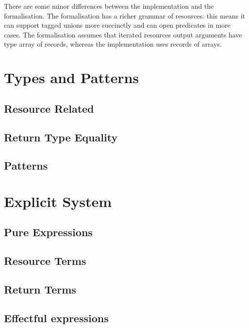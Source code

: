 \documentclass[11pt]{article}%
\begin{document}
There are some minor differences between the implementation and the
formalisation. The formalisation has a richer grammar of resources:
this means it can support tagged unions more succinctly and can open
predicates in more cases. The formalisation assumes that iterated
resources output arguments have type array of records, whereas the
implementation uses records of arrays.


\raggedright%

\section{Types and Patterns}

\subsection{Resource Related}
\cndefnsresXXjudge%

\subsection{Return Type Equality}
\cndefnsretXXjudge%

\subsection{Patterns}
\cndefnspatXXjudge%

\section{Explicit System}

\subsection{Pure Expressions}
\cndefnsexplXXpure%

\subsection{Resource Terms}
\cndefnsexplXXres%

\subsection{Return Terms}
\cndefnsexplXXspine%

\subsection{Effectful expressions}
\cndefnsexplXXaction%
\cndefnsexplXXmemop%
\cndefnsexplXXstmt%
\end{document}
